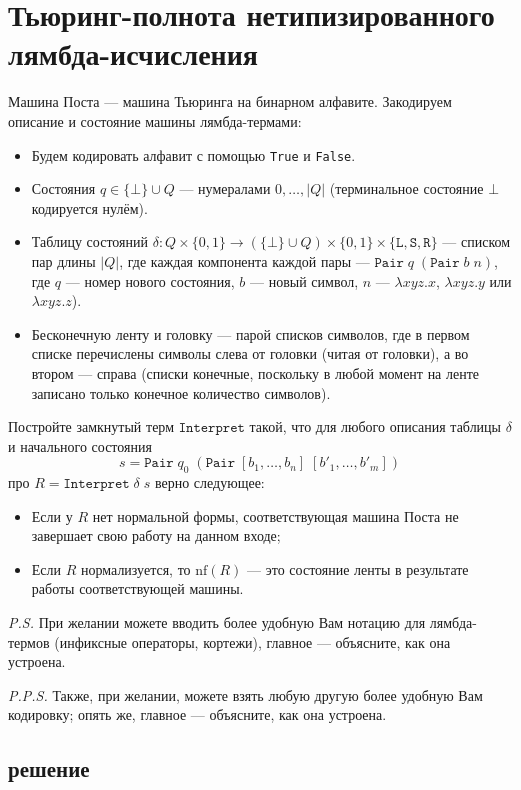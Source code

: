 \documentclass{article}
\begin{document}
\section*{\centering Тьюринг-полнота нетипизированного лямбда-исчисления}
Машина Поста --- машина Тьюринга на бинарном алфавите. Закодируем описание и состояние машины лямбда-термами:
\begin{itemize}
  \item Будем кодировать алфавит с помощью \verb|True| и \verb|False|.
  \item Состояния $q \in \{\bot\} \cup Q$ --- нумералами $0,\ldots,|Q|$ (терминальное состояние $\bot$ кодируется нулём).
  \item Таблицу состояний $\delta : Q \times \{0, 1\} \to (\{\bot\} \cup Q) \times \{0, 1\} \times \{\mathtt{L}, \mathtt{S}, \mathtt{R}\}$ --- списком пар длины $|Q|$, где каждая компонента каждой пары --- $\mathtt{Pair}\;q\;(\mathtt{Pair}\;b\;n)$, где $q$ --- номер нового состояния, $b$ --- новый символ, $n$ --- $\lambda xyz.x$, $\lambda xyz.y$ или $\lambda xyz.z$).
  \item Бесконечную ленту и головку --- парой списков символов, где в первом списке перечислены символы слева от головки (читая от головки), а во втором — справа (списки конечные, поскольку в любой момент на ленте записано только конечное количество символов).
\end{itemize}
Постройте замкнутый терм $\mathtt{Interpret}$ такой, что для любого описания таблицы $\delta$ и начального состояния
\[s = \mathtt{Pair}\;q_0\;(\mathtt{Pair}\;[b_1,\ldots,b_n]\;[b'_1,\ldots,b'_m])\]
про $R = \mathtt{Interpret}\;\delta\;s$ верно следующее:
\begin{itemize}
    \item Если у $R$ нет нормальной формы, соответствующая машина Поста не завершает свою работу на данном входе;
    \item Если $R$ нормализуется, то $\mathrm{nf}(R)$ --- это состояние ленты в результате работы соответствующей машины.
\end{itemize}

\textit{P.S.} При желании можете вводить более удобную Вам нотацию для лямбда-термов (инфиксные операторы, кортежи), главное --- объясните, как она устроена.

\textit{P.P.S.} Также, при желании, можете взять любую другую более удобную Вам кодировку; опять же, главное --- объясните, как она устроена.

\subsection*{решение}
\end{document}
